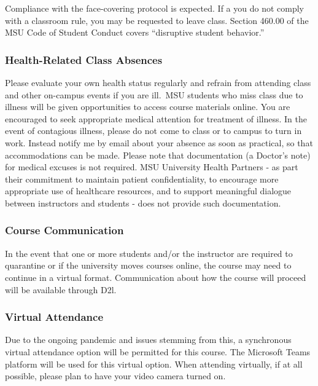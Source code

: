 \documentclass[11pt,]{article}
\begin{document}
Compliance with the face-covering protocol is expected. If a you do not
comply with a classroom rule, you may be requested to leave class.
Section 460.00 of the MSU Code of Student Conduct covers ``disruptive
student behavior.''

\hypertarget{health-related-class-absences}{%
\subsubsection{Health-Related Class
Absences}\label{health-related-class-absences}}

Please evaluate your own health status regularly and refrain from
attending class and other on-campus events if you are ill.~MSU students
who miss class due to illness will be given opportunities to access
course materials online. You are encouraged to seek appropriate medical
attention for treatment of illness. In the event of contagious illness,
please do not come to class or to campus to turn in work. Instead notify
me by email about your absence as soon as practical, so that
accommodations can be made. Please note that documentation (a Doctor's
note) for medical excuses is not required. MSU University Health
Partners - as part their commitment to maintain patient confidentiality,
to encourage more appropriate use of healthcare resources, and to
support meaningful dialogue between instructors and students - does not
provide such documentation.

\hypertarget{course-communication}{%
\subsubsection{Course Communication}\label{course-communication}}

In the event that one or more students and/or the instructor are
required to quarantine or if the university moves courses online, the
course may need to continue in a virtual format. Communication about how
the course will proceed will be available through D2l.

\hypertarget{virtual-attendance}{%
\subsubsection{Virtual Attendance}\label{virtual-attendance}}

Due to the ongoing pandemic and issues stemming from this, a synchronous
virtual attendance option will be permitted for this course. The
Microsoft Teams platform will be used for this virtual option. When
attending virtually, if at all possible, please plan to have your video
camera turned on.
\end{document}
